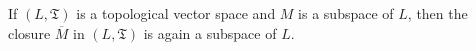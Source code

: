 If $(L, \mathfrak{T})$ is a topological vector space and $M$ is a subspace of $L$, then the closure $\overline{M}$ in $(L, \mathfrak{T})$ is again a subspace of $L$.
